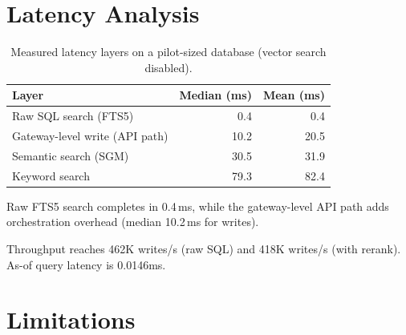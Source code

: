 \documentclass{llncs}
\begin{document}
\section{Latency Analysis}


\begin{table}[h]
\centering
\caption{Measured latency layers on a pilot-sized database (vector search disabled).}
\begin{tabular}{lrr}
\toprule
Layer & Median (ms) & Mean (ms) \\
\midrule
Raw SQL search (FTS5) & 0.4 & 0.4 \\
Gateway-level write (API path) & 10.2 & 20.5 \\
Semantic search (SGM) & 30.5 & 31.9 \\
Keyword search & 79.3 & 82.4 \\
\bottomrule
\end{tabular}
\end{table}

Raw FTS5 search completes in 0.4\,ms, while the gateway-level API path adds orchestration overhead (median 10.2\,ms for writes).

Throughput reaches 462K writes/s (raw SQL) and 418K writes/s (with rerank). As-of query latency is 0.0146ms.

\section{Limitations}
\end{document}
